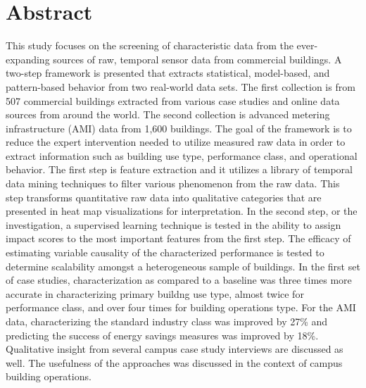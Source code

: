 \chapter{Abstract}

This study focuses on the screening of characteristic data from the ever-expanding sources of raw, temporal sensor data from commercial buildings. A two-step framework is presented that extracts statistical, model-based, and pattern-based behavior from two real-world data sets. The first collection is from 507 commercial buildings extracted from various case studies and online data sources from around the world. The second collection is advanced metering infrastructure (AMI) data from 1,600 buildings. The goal of the framework is to reduce the expert intervention needed to utilize measured raw data in order to extract information such as building use type, performance class, and operational behavior. The first step is feature extraction and it utilizes a library of temporal data mining techniques to filter various phenomenon from the raw data. This step transforms quantitative raw data into qualitative categories that are presented in heat map visualizations for interpretation. In the second step, or the investigation, a supervised learning technique is tested in the ability to assign impact scores to the most important features from the first step. The efficacy of estimating variable causality of the characterized performance is tested to determine scalability amongst a heterogeneous sample of buildings. In the first set of case studies, characterization as compared to a baseline was three times more accurate in characterizing primary buildng use type, almost twice for performance class, and over four times for building operations type. For the AMI data, characterizing the standard industry class was improved by 27\% and predicting the success of energy savings measures was improved by 18\%. Qualitative insight from several campus case study interviews are discussed as well. The usefulness of the approaches was discussed in the context of campus building operations.